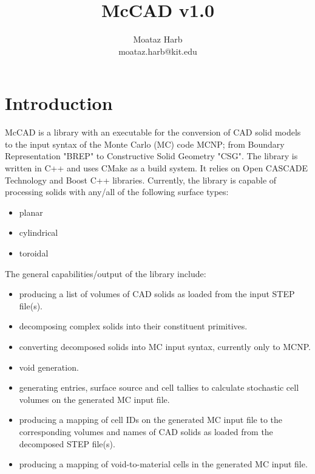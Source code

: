 \documentclass[12pt, a4paper, titlepage]{article}
\title{McCAD v1.0}
\author{Moataz Harb\\moataz.harb@kit.edu}
\affil{Karlsruhe Institute of Technology (KIT), Hermann-von-Helmholtz-Platz 1, 76344 Eggenstein-Leopoldshafen, Germany}
\begin{document}
\maketitle
\clearpage
\tableofcontents
\clearpage

\section{Introduction} \label{sec:Introduction}
McCAD is a library with an executable for the conversion of CAD solid models to the input syntax of the Monte Carlo (MC) code MCNP; from Boundary Representation "BREP" to Constructive Solid Geometry "CSG". The library is written in C++ and uses CMake as a build system. It relies on Open CASCADE Technology and Boost C++ libraries. Currently, the library is capable of processing solids with any/all of the following surface types:
\begin{itemize}
	\item planar
	\item cylindrical
	\item toroidal
\end{itemize}
The general capabilities/output of the library include:
\begin{itemize}
	\item producing a list of volumes of CAD solids as loaded from the input STEP file(s).
	\item decomposing complex solids into their constituent primitives.
	\item converting decomposed solids into MC input syntax, currently only to MCNP.
	\item void generation.
	\item generating entries, surface source and cell tallies to calculate stochastic cell volumes on the generated MC input file.
	\item producing a mapping of cell IDs on the generated MC input file to the corresponding volumes and names of CAD solids as loaded from the decomposed STEP file(s).
	\item producing a mapping of void-to-material cells in the generated MC input file.
\end{itemize}
\end{document}
